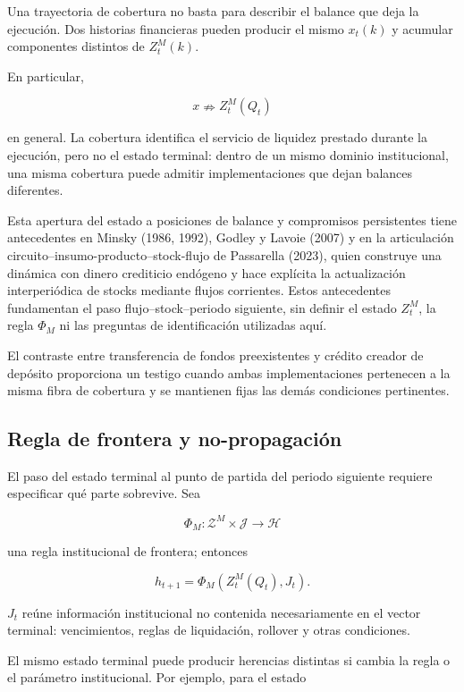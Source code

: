 \documentclass[10pt,a5paper,twoside]{article}
\begin{document}
Una trayectoria de cobertura no basta para describir el balance que deja la
ejecución. Dos historias financieras pueden producir el mismo \(x_t(k)\) y
acumular componentes distintos de \(Z_t^M(k)\).

En particular,

\[
x\nRightarrow Z_t^M(Q_t)
\]

en general. La cobertura identifica el servicio de liquidez prestado durante la ejecución,
pero no el estado terminal: dentro de un mismo dominio institucional, una misma
cobertura puede admitir implementaciones que dejan balances diferentes.

Esta apertura del estado a posiciones de balance y compromisos persistentes
tiene antecedentes en Minsky (1986, 1992), Godley y Lavoie (2007) y en la
articulación circuito--insumo-producto--stock-flujo de Passarella (2023),
quien construye una dinámica con dinero crediticio endógeno y hace explícita
la actualización interperiódica de stocks mediante flujos corrientes. Estos antecedentes
fundamentan el paso flujo--stock--periodo siguiente, sin definir el estado
\(Z_t^M\), la regla \(\Phi_M\) ni las preguntas de identificación
utilizadas aquí.

El contraste entre transferencia de fondos preexistentes y crédito
creador de depósito proporciona un testigo cuando ambas implementaciones
pertenecen a la misma fibra de cobertura y se mantienen fijas las demás
condiciones pertinentes.

\subsection{Regla de frontera y no-propagación}\label{regla-de-frontera-y-no-propagaciuxf3n}

El paso del estado terminal al punto de partida del periodo siguiente
requiere especificar qué parte sobrevive. Sea

\[
\Phi_M:\mathcal Z^M\times\mathcal J\to\mathcal H
\]

una regla institucional de frontera; entonces

\[
h_{t+1}
=
\Phi_M(Z_t^M(Q_t),J_t).
\]

\(J_t\) reúne información institucional no contenida necesariamente en
el vector terminal: vencimientos, reglas de liquidación, rollover y
otras condiciones.

El mismo estado terminal puede producir herencias distintas si cambia la
regla o el parámetro institucional. Por ejemplo, para el estado
\end{document}
